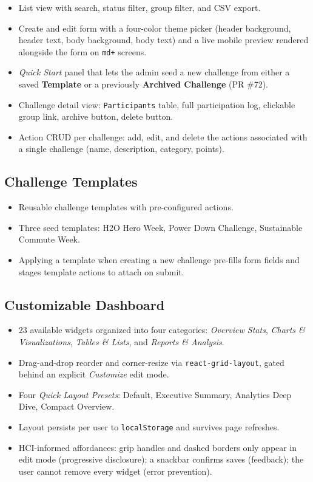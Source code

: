 \documentclass[11pt,letterpaper]{article}
\begin{document}
\begin{itemize}[noitemsep]
  \item List view with search, status filter, group filter, and CSV
        export.
  \item Create and edit form with a four-color theme picker
        (header background, header text, body background, body text)
        and a live mobile preview rendered alongside the form on
        \texttt{md+} screens.
  \item \emph{Quick Start} panel that lets the admin seed a new
        challenge from either a saved \textbf{Template} or a
        previously \textbf{Archived Challenge} (PR \#72).
  \item Challenge detail view: \texttt{Participants} table, full
        participation log, clickable group link, archive button,
        delete button.
  \item Action CRUD per challenge: add, edit, and delete the
        actions associated with a single challenge (name,
        description, category, points).
\end{itemize}

\subsection{Challenge Templates}

\begin{itemize}[noitemsep]
  \item Reusable challenge templates with pre-configured actions.
  \item Three seed templates: H2O Hero Week, Power Down Challenge,
        Sustainable Commute Week.
  \item Applying a template when creating a new challenge pre-fills
        form fields and stages template actions to attach on
        submit.
\end{itemize}

\subsection{Customizable Dashboard}

\begin{itemize}[noitemsep]
  \item 23 available widgets organized into four categories:
        \emph{Overview Stats}, \emph{Charts \& Visualizations},
        \emph{Tables \& Lists}, and \emph{Reports \& Analysis}.
  \item Drag-and-drop reorder and corner-resize via
        \texttt{react-grid-layout}, gated behind an explicit
        \emph{Customize} edit mode.
  \item Four \emph{Quick Layout Presets}: Default, Executive
        Summary, Analytics Deep Dive, Compact Overview.
  \item Layout persists per user to \texttt{localStorage} and
        survives page refreshes.
  \item HCI-informed affordances: grip handles and dashed borders
        only appear in edit mode (progressive disclosure); a
        snackbar confirms saves (feedback); the user cannot remove
        every widget (error prevention).
\end{itemize}
\end{document}
